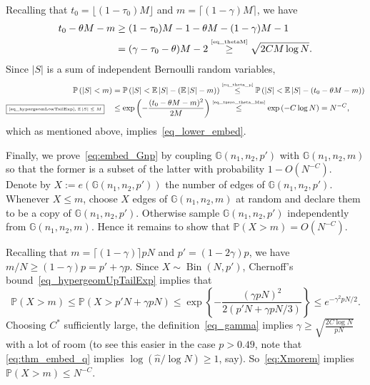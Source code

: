 \documentclass[12pt,reqno]{amsart}
\newcommand{\E}{\operatorname{\mathbb{E}}}
\newcommand{\Prob} {\mathbb {P}}
\newcommand{\prob}[1]{\Prob\left(#1\right)}
\newcommand{\G} {\mathbb G}
\newcommand{\Bi}{\operatorname{Bin}}
\theoremstyle{definition}
\newcommand{\justify}[1]{\fbox{\tiny{#1}}\quad}
\newcommand{\ceil}[1]{\lceil{#1}\rceil}
\newcommand{\By}[2]{\overset{\mbox{\tiny\ensuremath{#1}}}{#2}}
\begin{document}
 \medskip
 Recalling that $t_0 = \lfloor (1 - \tau_0)M \rfloor$ and $m = \lceil(1-\gamma)M\rceil$, we have
 \begin{equation}
   \label{eq_tzero_theta_Mm}
   \begin{split}
     t_0 - \theta M - m &\ge (1-\tau_0)M - 1 - \theta M - (1-\gamma)M - 1 \\
     &= (\gamma - \tau_0 - \theta)M - 2 \By{\eqref{eq_thetaM}}{\ge} \sqrt{2C M \log N}.
   \end{split}
 \end{equation}
 Since $|S|$ is a sum of independent Bernoulli random variables,
\begin{align*}
  \prob{|S| < m} &= \prob{|S|  < \E|S|- (\E|S| - m) } \By{\eqref{eq_theta_p}}{\le} \prob{|S|  < \E|S| -(t_0 - \theta M - m)} \\
  \justify{\eqref{eq_hypergeomLowTailExp}, $\E |S| \le M$} &\By{}{\le} \exp \left( -\frac{(t_0 - \theta M - m)^2}{2M} \right)
 \By{\eqref{eq_tzero_theta_Mm}}{\le} \exp \left( - C \log N \right) = N^{-C},
\end{align*}
which as mentioned above, implies~\eqref{eq_lower_embed}.

\medskip

Finally, we prove~\eqref{eq:embed_Gnp} by coupling $\G(n_1, n_2, p')$ with $\G(n_1,n_2, m)$ so that the former is a subset of the latter with probability $1 - O(N^{-C})$.
	Denote by $X := e(\G(n_1,n_2,p'))$ the number of edges of $\G(n_1,n_2, p')$.
	Whenever $X \le m$,  choose $X$ edges of $\G(n_1,n_2,m)$ at random and declare them to be a copy of $\G(n_1,n_2,p')$. Otherwise sample $\G(n_1,n_2,p')$ independently from $\G(n_1,n_2,m)$. Hence it remains to show that $\prob{X > m} = O(N^{-C})$.

	Recalling that $m = \ceil{(1-\gamma)}pN$ and $p' = (1 - 2\gamma)p$, we have $m/N \ge (1 - \gamma)p = p' + \gamma p$. Since $X \sim \Bi(N,p')$, Chernoff's bound~\eqref{eq_hypergeomUpTailExp} implies that
	\begin{equation}
	  \label{eq:Xmorem}
		\prob{X > m} \le \prob{X > p'N + \gamma p N} \le \exp\left\{ -\frac{(\gamma pN)^2}{2(p'N + \gamma pN/3)} \right\} \le e^{-\gamma^2pN/2}.
	\end{equation}
	Choosing $C^*$ sufficiently large, the definition~\eqref{eq_gamma} implies $\gamma \ge \sqrt{\frac{2C\log N}{p N}}$ with a lot of room (to see this easier in the case $p > 0.49$, note that \eqref{eq:thm_embed_q} implies $\log(\hat n/\log N) \ge 1$, say). So~\eqref{eq:Xmorem} implies $\prob{X > m} \le N^{-C}$.
\end{document}
